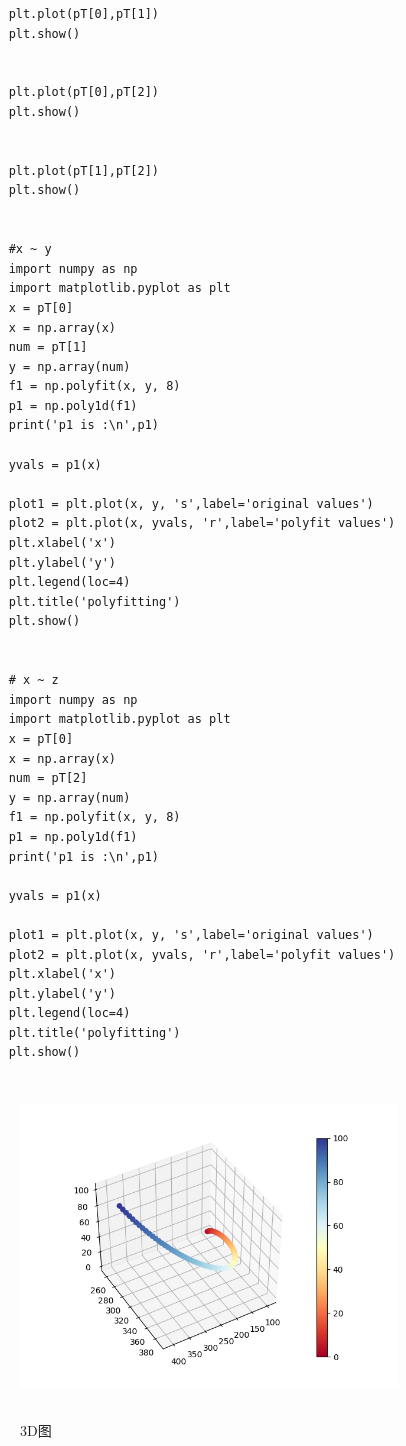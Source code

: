 \documentclass[UTF8]{ctexart}
\begin{document}
\begin{lstlisting}
	plt.plot(pT[0],pT[1])
	plt.show()


	plt.plot(pT[0],pT[2])
	plt.show()


	plt.plot(pT[1],pT[2])
	plt.show()


	#x ~ y
	import numpy as np
	import matplotlib.pyplot as plt
	x = pT[0]
	x = np.array(x)
	num = pT[1]
	y = np.array(num)
	f1 = np.polyfit(x, y, 8)
	p1 = np.poly1d(f1)
	print('p1 is :\n',p1)

	yvals = p1(x)

	plot1 = plt.plot(x, y, 's',label='original values')
	plot2 = plt.plot(x, yvals, 'r',label='polyfit values')
	plt.xlabel('x')
	plt.ylabel('y')
	plt.legend(loc=4) 
	plt.title('polyfitting')
	plt.show()


	# x ~ z
	import numpy as np
	import matplotlib.pyplot as plt
	x = pT[0]
	x = np.array(x)
	num = pT[2]
	y = np.array(num)
	f1 = np.polyfit(x, y, 8)
	p1 = np.poly1d(f1)
	print('p1 is :\n',p1)

	yvals = p1(x)

	plot1 = plt.plot(x, y, 's',label='original values')
	plot2 = plt.plot(x, yvals, 'r',label='polyfit values')
	plt.xlabel('x')
	plt.ylabel('y')
	plt.legend(loc=4) 
	plt.title('polyfitting')
	plt.show()
\end{lstlisting}
\begin{figure}[H]
 \centering
  \includegraphics[width=10cm,height=9cm]{2001_0.png}
  \caption{3D图}
\end{figure}
\end{document}
